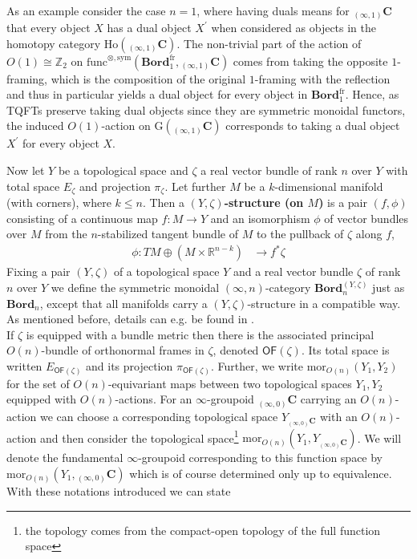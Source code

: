 \\
\begin{exa}
\label{exa:o1action}
As an example consider the case $n = 1$, where having duals means for ${_{(\infty,1)}}\mathbf{C}$ that every object $X$ has a dual object $X^{\prime}$ when considered as objects in the homotopy category $\mathrm{Ho}({_{(\infty,1)}}\mathbf{C})$. The non-trivial part of the action of $O(1) \cong \mathbb{Z}_{2}$ on $\mathrm{func}^{\otimes,\mathrm{sym}}(\mathbf{Bord}_{1}^{\mathrm{fr}},{_{(\infty,1)}}\mathbf{C})$ comes from taking the opposite $1$-framing, which is the composition of the original $1$-framing with the reflection and thus in particular yields a dual object for every object in $\mathbf{Bord}_{1}^{\mathrm{fr}}$. Hence, as TQFTs preserve taking dual objects since they are symmetric monoidal functors, the induced $O(1)$-action on $\mathrm{G}({_{(\infty,1)}}\mathbf{C})$ corresponds to taking a dual object $X^{\prime}$ for every object $X$.
\end{exa}
Now let $Y$ be a topological space and $\zeta$ a real vector bundle of rank $n$ over $Y$ with total space $E_{\zeta}$ and projection $\pi_{\zeta}$. Let further $M$ be a $k$-dimensional manifold (with corners), where $k \leq n$. Then a \textbf{$(Y,\zeta)$-structure (on $M$)} is a pair $(f,\phi)$ consisting of a continuous map $f \colon M \to Y$ and an isomorphism $\phi$ of vector bundles over $M$ from the $n$-stabilized tangent bundle of $M$ to the pullback of $\zeta$ along $f$,
\begin{align*}
  \phi
  \colon
  TM
  \oplus
  (M \times \mathbb{R}^{n-k})
  &\to
  f^{\ast}
  \zeta
\end{align*}
Fixing a pair $(Y,\zeta)$ of a topological space $Y$ and a real vector bundle $\zeta$ of rank $n$ over $Y$ we define the symmetric monoidal $(\infty,n)$-category $\mathbf{Bord}_{n}^{(Y,\zeta)}$ just as $\mathbf{Bord}_{n}$, except that all manifolds carry a $(Y,\zeta)$-structure in a compatible way. As mentioned before, details can e.g. be found in \cite{29781dd2}.
\\
If $\zeta$ is equipped with a bundle metric then there is the associated principal $O(n)$-bundle of orthonormal frames in $\zeta$, denoted $\mathsf{OF}(\zeta)$. Its total space is written $E_{\mathsf{OF}(\zeta)}$ and its projection $\pi_{\mathsf{OF}(\zeta)}$. Further, we write $\mathrm{mor}_{O(n)}(Y_{1},Y_{2})$ for the set of $O(n)$-equivariant maps between two topological spaces $Y_{1},Y_{2}$ equipped with $O(n)$-actions. For an $\infty$-groupoid ${_{(\infty,0)}}\mathbf{C}$ carrying an $O(n)$-action we can choose a corresponding topological space $Y_{{_{(\infty,0)}}\mathbf{C}}$ with an $O(n)$-action and then consider the topological space\footnote{the topology comes from the compact-open topology of the full function space} $\mathrm{mor}_{O(n)}(Y_{1},Y_{{_{(\infty,0)}}\mathbf{C}})$. We will denote the fundamental $\infty$-groupoid corresponding to this function space by $\mathrm{mor}_{O(n)}(Y_{1},{_{(\infty,0)}}\mathbf{C})$ which is of course determined only up to equivalence. With these notations introduced we can state
